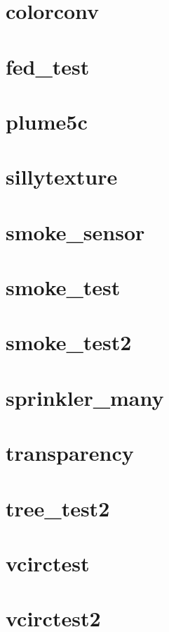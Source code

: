 \documentclass[11pt,twoside]{book}
\begin{document}
\section{colorconv}
\label{SSFcolorconv}

\section{fed\_test}

\section{plume5c}
\label{SSFplume5c}

\section{sillytexture}

\section{smoke\_sensor}
\label{SSFsmokesensor}

\section{smoke\_test}
\label{SSFsmoketest}

\section{smoke\_test2}
\label{SSFsmoketest2}

\section{sprinkler\_many}
\label{SSFspinklermany}

\section{transparency}
\label{SSFtransparency}

\section{tree\_test2}

\section{vcirctest}

\section{vcirctest2}
\end{document}

